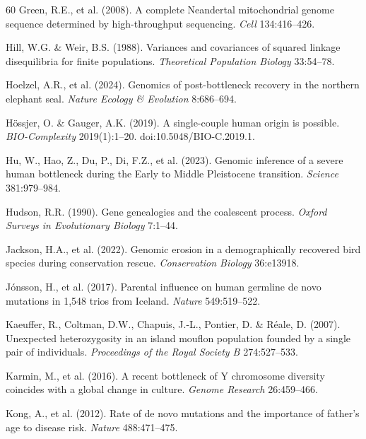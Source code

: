 \begin{thebibliography}{60}
Green, R.E., et al. (2008). A complete Neandertal mitochondrial genome
sequence determined by high-throughput sequencing. \emph{Cell}
134:416--426.

Hill, W.G. \& Weir, B.S. (1988). Variances and covariances of squared
linkage disequilibria for finite populations. \emph{Theoretical
Population Biology} 33:54--78.

Hoelzel, A.R., et al. (2024). Genomics of post-bottleneck recovery in the
northern elephant seal. \emph{Nature Ecology \& Evolution} 8:686--694.

H\"ossjer, O. \& Gauger, A.K. (2019). A single-couple human origin is
possible. \emph{BIO-Complexity} 2019(1):1--20. doi:10.5048/BIO-C.2019.1.

Hu, W., Hao, Z., Du, P., Di, F.Z., et al. (2023). Genomic inference of a
severe human bottleneck during the Early to Middle Pleistocene transition.
\emph{Science} 381:979--984.

Hudson, R.R. (1990). Gene genealogies and the coalescent process.
\emph{Oxford Surveys in Evolutionary Biology} 7:1--44.

Jackson, H.A., et al. (2022). Genomic erosion in a demographically
recovered bird species during conservation rescue. \emph{Conservation
Biology} 36:e13918.

J\'onsson, H., et al. (2017). Parental influence on human germline de novo
mutations in 1,548 trios from Iceland. \emph{Nature} 549:519--522.

Kaeuffer, R., Coltman, D.W., Chapuis, J.-L., Pontier, D. \& R\'eale, D.
(2007). Unexpected heterozygosity in an island mouflon population founded
by a single pair of individuals. \emph{Proceedings of the Royal Society B}
274:527--533.

Karmin, M., et al. (2016). A recent bottleneck of Y chromosome diversity
coincides with a global change in culture. \emph{Genome Research}
26:459--466.

Kong, A., et al. (2012). Rate of de novo mutations and the importance of
father's age to disease risk. \emph{Nature} 488:471--475.


\end{thebibliography}
